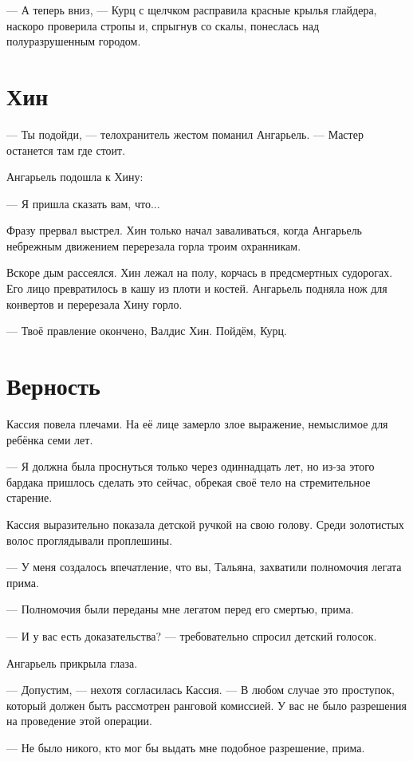 --- А теперь вниз, --- Курц с щелчком расправила красные крылья глайдера, наскоро проверила стропы и, спрыгнув со скалы, понеслась над полуразрушенным городом.

\section{Хин}

--- Ты подойди, --- телохранитель жестом поманил Ангарьель.
--- Мастер останется там где стоит.

Ангарьель подошла к Хину:

--- Я пришла сказать вам, что...

Фразу прервал выстрел.
Хин только начал заваливаться, когда Ангарьель небрежным движением перерезала горла троим охранникам.

Вскоре дым рассеялся.
Хин лежал на полу, корчась в предсмертных судорогах.
Его лицо превратилось в кашу из плоти и костей.
Ангарьель подняла нож для конвертов и перерезала Хину горло.

--- Твоё правление окончено, Валдис Хин.
Пойдём, Курц.

\section{Верность}

Кассия повела плечами.
На её лице замерло злое выражение, немыслимое для ребёнка семи лет.

--- Я должна была проснуться только через одиннадцать лет, но из-за этого бардака пришлось сделать это сейчас, обрекая своё тело на стремительное старение.

Кассия выразительно показала детской ручкой на свою голову.
Среди золотистых волос проглядывали проплешины.

--- У меня создалось впечатление, что вы, Тальяна, захватили полномочия легата прима.

--- Полномочия были переданы мне легатом перед его смертью, прима.

--- И у вас есть доказательства? --- требовательно спросил детский голосок.

Ангарьель прикрыла глаза.

--- Допустим, --- нехотя согласилась Кассия.
--- В любом случае это проступок, который должен быть рассмотрен ранговой комиссией.
У вас не было разрешения на проведение этой операции.

--- Не было никого, кто мог бы выдать мне подобное разрешение, прима.

